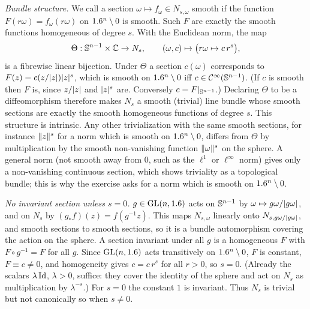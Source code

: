\subsection*{}
\emph{Bundle structure.} We call a section $\omega\mapsto f_\omega\in N_{s,\omega}$ smooth if the
function $F(r\omega)=f_\omega(r\omega)$ on $1.6^n\setminus0$ is smooth. Such $F$ are exactly the smooth
functions homogeneous of degree $s$. With the Euclidean norm, the map
\begin{equation*}
\Theta:\mathbb{S}^{n-1}\times\mathbb{C}\to N_s,\qquad(\omega,c)\mapsto\big(r\omega\mapsto c\,r^s\big),
\end{equation*}
is a fibrewise linear bijection. Under $\Theta$ a section $c(\omega)$ corresponds to
$F(z)=c(z/\lvert z\rvert)\lvert z\rvert^s$, which is smooth on $1.6^n\setminus0$ iff $c\in\mathcal{C}^\infty(\mathbb{S}^{n-1})$. (If $c$ is
smooth then $F$ is, since $z/\lvert z\rvert$ and $\lvert z\rvert^s$ are. Conversely $c=F|_{\mathbb{S}^{n-1}}$.)
Declaring $\Theta$ to be a diffeomorphism therefore makes $N_s$ a smooth (trivial) line
bundle whose smooth sections are exactly the smooth homogeneous functions of degree $s$.
This structure is intrinsic. Any other trivialization with the same smooth sections,
for instance $\lVert z\rVert^s$ for a norm which is smooth on $1.6^n\setminus0$, differs from $\Theta$ by
multiplication by the smooth non-vanishing function $\lVert \omega\rVert^s$ on the sphere. A general
norm (not smooth away from $0$, such as the $\ell^1$ or $\ell^\infty$ norm) gives only a
non-vanishing continuous section, which shows triviality as a topological bundle; this
is why the exercise asks for a norm which is smooth on $1.6^n\setminus0$.

\emph{No invariant section unless $s=0$.} $g\in\operatorname{GL}(n,1.6)$ acts on $\mathbb{S}^{n-1}$ by
$\omega\mapsto g\omega/\lvert g\omega\rvert$, and on $N_s$ by $(g_*f)(z)=f(g^{-1}z)$. This maps $N_{s,\omega}$
linearly onto $N_{s,g\omega/\lvert g\omega\rvert}$, and smooth sections to smooth sections, so it is a
bundle automorphism covering the action on the sphere. A section invariant under all $g$
is a homogeneous $F$ with $F\circ g^{-1}=F$ for all $g$. Since $\operatorname{GL}(n,1.6)$ acts transitively on
$1.6^n\setminus0$, $F$ is constant, $F\equiv c\ne0$, and homogeneity gives $c=c\,r^s$ for all $r>0$,
so $s=0$. (Already the scalars $\lambda\operatorname{Id}$, $\lambda>0$, suffice: they cover the identity of the
sphere and act on $N_s$ as multiplication by $\lambda^{-s}$.) For $s=0$ the constant $1$ is
invariant. Thus $N_s$ is trivial but not canonically so when $s\ne0$.

